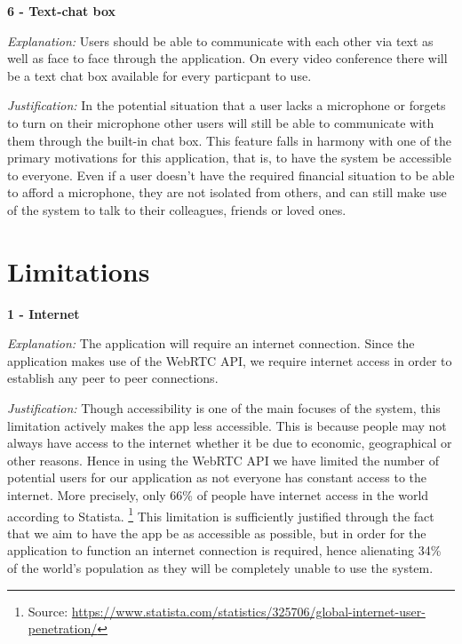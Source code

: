 \textbf{6 - Text-chat box} \\ \vspace{0.1cm}

\textit{Explanation:}
Users should be able to communicate with each other via text
as well as face to face through the application. On every
video conference there will be a text chat box available for
every particpant to use. \vspace{0.1cm}

\textit{Justification:}
In the potential situation that a user
lacks a microphone or forgets to turn on their microphone other 
users will still be able to communicate with them through the 
built-in chat box. This feature falls in harmony with one of 
the primary motivations for this application, that is, to have 
the system be accessible to everyone. Even if a user doesn't
have the required financial situation to be able to afford a 
microphone, they are not isolated from others, and can still 
make use of the system to talk to their colleagues, friends
or loved ones.

\section{Limitations}

\textbf{1 - Internet} \\ \vspace{0.1cm} 

\textit{Explanation:}
The application will require an internet connection. Since the
application makes use of the WebRTC API, we require internet 
access in order to establish any peer to peer connections.
\vspace{0.1cm}

\textit{Justification:}
Though accessibility is one of the main focuses of the system,
this limitation actively makes the app less accessible. This
is because people may not always have access to the internet 
whether it be due to economic, geographical or other reasons.
Hence in using the WebRTC API we have limited the number of 
potential users for our application as not everyone has 
constant access to the internet. More precisely, only 66\% of 
people have internet access in the world according to Statista.
\footnote{Source: \url{https://www.statista.com/statistics/325706/global-internet-user-penetration/}}
This limitation is sufficiently justified through the fact that
we aim to have the app be as accessible as possible, but in 
order for the application to function an internet connection is
required, hence alienating 34\% of the world's population as they
will be completely unable to use the system. \\ \vspace{0.2cm}

